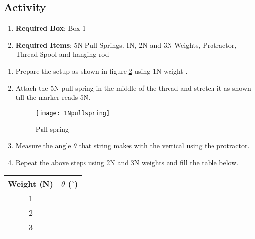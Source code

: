 \documentclass[10pt]{article}
\begin{document}
\subsection{Activity}
\begin{enumerate}
\item \textbf{Required Box}: Box 1
\item \textbf{Required Items}: 5N Pull Springs, 1N, 2N and 3N Weights, Protractor, Thread Spool and hanging rod
\end{enumerate}
\newpage
\begin{enumerate}
\begin{figure}[h]
\label{1nweight}
\texttt{[image: 1Nweight]}
\centering
\caption{Setup}
\end{figure}
\item Prepare the setup as shown in figure \ref{1nweight} using 1N weight .
\item Attach the 5N pull spring in the middle of the thread and stretch it as shown till the marker reads 5N.
\begin{figure}[h]
\label{1nweight}
\texttt{[image: 1Npullspring]}
\centering
\caption{Pull spring}
\end{figure}
\item Measure the angle $\theta$ that string makes with the vertical using the protractor.
\item Repeat the above steps using 2N and 3N weights and fill the table below.
\end{enumerate}
\begin{center}
 \begin{tabular}{||c c||} 
 \hline
 Weight (N) & $\theta$ ($^{\circ}$) \\ [0.5ex] 
 \hline\hline
 1 &   \\ 
 \hline
 2 &  \\
\hline
 3 & \\
\hline
\end{tabular}
\end{center}
\end{document}
